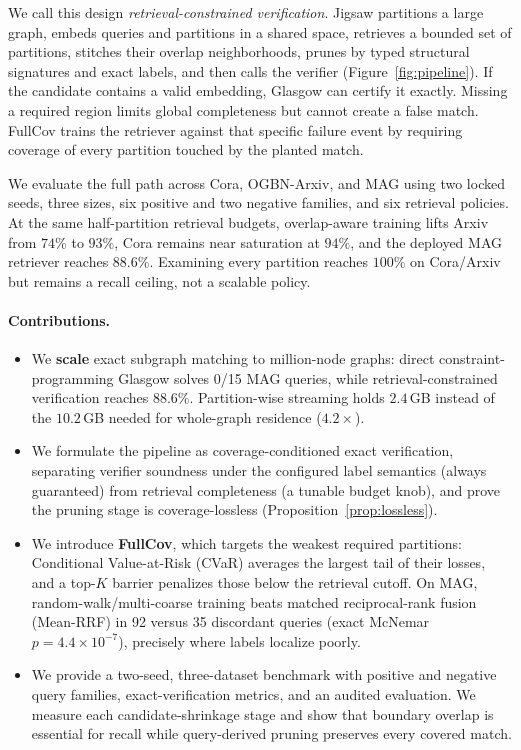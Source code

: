 \documentclass{article}
\begin{document}
We call this design \emph{retrieval-constrained verification}. Jigsaw partitions a large graph, embeds queries and partitions in a shared space, retrieves a bounded set of partitions, stitches their overlap neighborhoods, prunes by typed structural signatures and exact labels, and then calls the verifier (Figure~\ref{fig:pipeline}). If the candidate contains a valid embedding, Glasgow can certify it exactly. Missing a required region limits global completeness but cannot create a false match. FullCov trains the retriever against that specific failure event by requiring coverage of every partition touched by the planted match.

We evaluate the full path across Cora, OGBN-Arxiv, and MAG using two locked seeds, three sizes, six positive and two negative families, and six retrieval policies. At the same half-partition retrieval budgets, overlap-aware training lifts Arxiv from $74\%$ to $93\%$, Cora remains near saturation at $94\%$, and the deployed MAG retriever reaches $88.6\%$. Examining every partition reaches $100\%$ on Cora/Arxiv but remains a recall ceiling, not a scalable policy.

\paragraph{Contributions.}
\begin{itemize}
    \item We \textbf{scale} exact subgraph matching to million-node graphs: direct constraint-programming Glasgow solves 0/15 MAG queries, while retrieval-constrained verification reaches $88.6\%$. Partition-wise streaming holds $2.4$\,GB instead of the $10.2$\,GB needed for whole-graph residence ($4.2\times$).
    \item We formulate the pipeline as coverage-conditioned exact verification, separating verifier soundness under the configured label semantics (always guaranteed) from retrieval completeness (a tunable budget knob), and prove the pruning stage is coverage-lossless (Proposition~\ref{prop:lossless}).
    \item We introduce \textbf{FullCov}, which targets the weakest required partitions: Conditional Value-at-Risk (CVaR) averages the largest tail of their losses, and a top-$K$ barrier penalizes those below the retrieval cutoff. On MAG, random-walk/multi-coarse training beats matched reciprocal-rank fusion (Mean-RRF) in 92 versus 35 discordant queries (exact McNemar $p{=}4.4{\times}10^{-7}$), precisely where labels localize poorly.
    \item We provide a two-seed, three-dataset benchmark with positive and negative query families, exact-verification metrics, and an audited evaluation. We measure each candidate-shrinkage stage and show that boundary overlap is essential for recall while query-derived pruning preserves every covered match.
\end{itemize}
\end{document}

